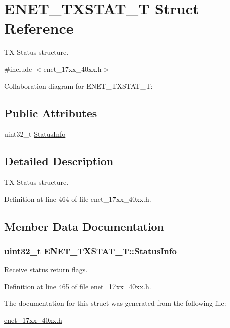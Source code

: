 \hypertarget{structENET__TXSTAT__T}{}\section{E\+N\+E\+T\+\_\+\+T\+X\+S\+T\+A\+T\+\_\+T Struct Reference}
\label{structENET__TXSTAT__T}


TX Status structure.  




{\ttfamily \#include $<$enet\+\_\+17xx\+\_\+40xx.\+h$>$}



Collaboration diagram for E\+N\+E\+T\+\_\+\+T\+X\+S\+T\+A\+T\+\_\+T\+:
\subsection*{Public Attributes}
\begin{DoxyCompactItemize}
\item 
uint32\+\_\+t \hyperlink{structENET__TXSTAT__T_a8b19a43922a609a6b5e477c3d5dae72f}{Status\+Info}
\end{DoxyCompactItemize}


\subsection{Detailed Description}
TX Status structure. 

Definition at line 464 of file enet\+\_\+17xx\+\_\+40xx.\+h.



\subsection{Member Data Documentation}
\subsubsection[{\texorpdfstring{Status\+Info}{StatusInfo}}]{\setlength{\rightskip}{0pt plus 5cm}uint32\+\_\+t E\+N\+E\+T\+\_\+\+T\+X\+S\+T\+A\+T\+\_\+\+T\+::\+Status\+Info}\hypertarget{structENET__TXSTAT__T_a8b19a43922a609a6b5e477c3d5dae72f}{}\label{structENET__TXSTAT__T_a8b19a43922a609a6b5e477c3d5dae72f}
Receive status return flags. 

Definition at line 465 of file enet\+\_\+17xx\+\_\+40xx.\+h.



The documentation for this struct was generated from the following file\+:\begin{DoxyCompactItemize}
\item 
\hyperlink{enet__17xx__40xx_8h}{enet\+\_\+17xx\+\_\+40xx.\+h}\end{DoxyCompactItemize}
